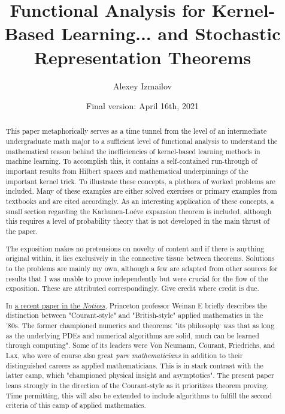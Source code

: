 \documentclass[psamsfonts]{amsart}
\title{Functional Analysis for Kernel-Based Learning... and Stochastic Representation Theorems}
\author{Alexey Izmailov}
\date{Final version: April 16th, 2021}
\theoremstyle{definition}
\theoremstyle{remark}
\numberwithin{equation}{section}
\begin{document}
\begin{abstract}
This paper metaphorically serves as a time tunnel from the level of an intermediate undergraduate math major to a sufficient level of functional analysis to understand the mathematical reason behind the inefficiencies of kernel-based learning methods in machine learning. To accomplish this, it contains a self-contained run-through of important results from Hilbert spaces and mathematical underpinnings of the important kernel trick. To illustrate these concepts, a plethora of worked problems are included. Many of these examples are either solved exercises or primary examples from textbooks and are cited accordingly. As an interesting application of these concepts, a small section regarding the Karhunen-Lo\'{e}ve expansion theorem is included, although this requires a level of probability theory that is not developed in the main thrust of the paper. 

The exposition makes no pretensions on novelty of content and if there is anything original within, it lies exclusively in the connective tissue between theorems. Solutions to the problems are mainly my own, although a few are adapted from other sources for results that I was unable to prove independently but were crucial for the flow of the exposition. These are attributed correspondingly. Give credit where credit is due. 

In \href{https://www.ams.org/journals/notices/202104/rnoti-p565.pdf}{a recent paper in the \textit{Notices}}, Princeton professor Weinan E briefly describes the distinction between "Courant-style" and "British-style" applied mathematics in the '80s. The former championed numerics and theorems: "its philosophy was that as long as the underlying PDEs and numerical algorithms are solid, much can be learned through computing". Some of its leaders were Von Neumann, Courant, Friedrichs, and Lax, who were of course also great \textit{pure mathematicians} in addition to their distinguished careers as applied mathematicians. This is in stark contrast with the latter camp, which "championed physical insight and asymptotics". The present paper leans strongly in the direction of the Courant-style as it prioritizes theorem proving. Time permitting, this will also be extended to include algorithms to fulfill the second criteria of this camp of applied mathematics. 
\end{abstract}



\maketitle
\pagebreak
\tableofcontents
\pagebreak
\end{document}
